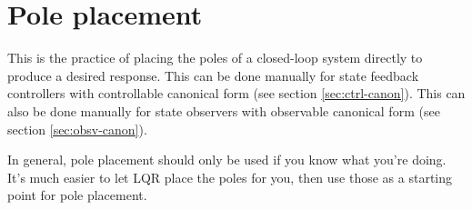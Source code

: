 \section{Pole placement}

This is the practice of placing the poles of a closed-loop system directly to
produce a desired response. This can be done manually for state feedback
controllers with controllable canonical form (see section \ref{sec:ctrl-canon}).
This can also be done manually for state observers with observable canonical
form (see section \ref{sec:obsv-canon}).

In general, pole placement should only be used if you know what you're doing.
It's much easier to let LQR place the poles for you, then use those as a
starting point for pole placement.
